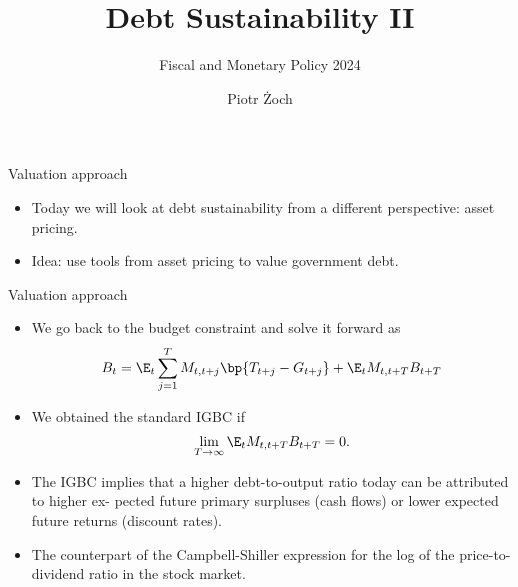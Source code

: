\documentclass[11pt,xcolor={dvipsnames},aspectratio=159,hyperref={pdftex,pdfpagemode=UseNone,hidelinks,pdfdisplaydoctitle=true},usepdftitle=false]{beamer}
\begin{document}
\title{Debt Sustainability II}
\subtitle{Fiscal and Monetary Policy 2024}

\author{Piotr Żoch}%
\frame{\titlepage}


\begin{frame}
\end{frame}

\begin{frame}{Valuation approach}
    \begin{itemize}
        \item Today we will look at debt sustainability from a different perspective: asset pricing.
        \item Idea: use tools from asset pricing to value government debt.
    \end{itemize}
\end{frame}

\begin{frame}{Valuation approach}
    \begin{itemize}
        \item We go back to the budget constraint and solve it forward as 
        \begin{align*}
            B_t = \E_t \sum_{j=1}^T M_{t,t+j} \bp{T_{t+j}-G_{t+j}} + \E_t M_{t,t+T} B_{t+T}
        \end{align*}
        \item We obtained the standard IGBC if \begin{align*}
            \lim_{T\to\infty} \E_t M_{t,t+T} B_{t+T} = 0.
        \end{align*}
        \item The IGBC implies that a higher debt-to-output ratio today can be attributed to higher ex-
        pected future primary surpluses (cash flows) or lower expected future returns (discount rates).
        \item The counterpart of the Campbell-Shiller expression for the log of the price-to-dividend ratio in the stock market. 
    \end{itemize}
\end{frame}
\end{document}
